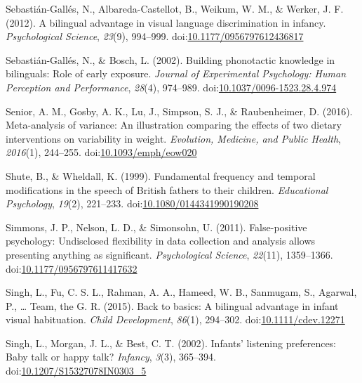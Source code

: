 \documentclass[,man,floatsintext]{apa6}
\begin{document}
\leavevmode\hypertarget{ref-sebastian_galles_2012}{}%
Sebastián-Gallés, N., Albareda-Castellot, B., Weikum, W. M., \& Werker, J. F. (2012). A bilingual advantage in visual language discrimination in infancy. \emph{Psychological Science}, \emph{23}(9), 994--999. doi:\href{https://doi.org/10.1177/0956797612436817}{10.1177/0956797612436817}

\leavevmode\hypertarget{ref-sebastian_galles_2002}{}%
Sebastián-Gallés, N., \& Bosch, L. (2002). Building phonotactic knowledge in bilinguals: Role of early exposure. \emph{Journal of Experimental Psychology: Human Perception and Performance}, \emph{28}(4), 974--989. doi:\href{https://doi.org/10.1037/0096-1523.28.4.974}{10.1037/0096-1523.28.4.974}

\leavevmode\hypertarget{ref-senior_2016}{}%
Senior, A. M., Gosby, A. K., Lu, J., Simpson, S. J., \& Raubenheimer, D. (2016). Meta-analysis of variance: An illustration comparing the effects of two dietary interventions on variability in weight. \emph{Evolution, Medicine, and Public Health}, \emph{2016}(1), 244--255. doi:\href{https://doi.org/10.1093/emph/eow020}{10.1093/emph/eow020}

\leavevmode\hypertarget{ref-shute_1999}{}%
Shute, B., \& Wheldall, K. (1999). Fundamental frequency and temporal modifications in the speech of British fathers to their children. \emph{Educational Psychology}, \emph{19}(2), 221--233. doi:\href{https://doi.org/10.1080/0144341990190208}{10.1080/0144341990190208}

\leavevmode\hypertarget{ref-simmons_2011}{}%
Simmons, J. P., Nelson, L. D., \& Simonsohn, U. (2011). False-positive psychology: Undisclosed flexibility in data collection and analysis allows presenting anything as significant. \emph{Psychological Science}, \emph{22}(11), 1359--1366. doi:\href{https://doi.org/10.1177/0956797611417632}{10.1177/0956797611417632}

\leavevmode\hypertarget{ref-singh_2015}{}%
Singh, L., Fu, C. S. L., Rahman, A. A., Hameed, W. B., Sanmugam, S., Agarwal, P., \ldots{} Team, the G. R. (2015). Back to basics: A bilingual advantage in infant visual habituation. \emph{Child Development}, \emph{86}(1), 294--302. doi:\href{https://doi.org/10.1111/cdev.12271}{10.1111/cdev.12271}

\leavevmode\hypertarget{ref-singh_2002}{}%
Singh, L., Morgan, J. L., \& Best, C. T. (2002). Infants' listening preferences: Baby talk or happy talk? \emph{Infancy}, \emph{3}(3), 365--394. doi:\href{https://doi.org/10.1207/S15327078IN0303_5}{10.1207/S15327078IN0303\_5}
\end{document}

